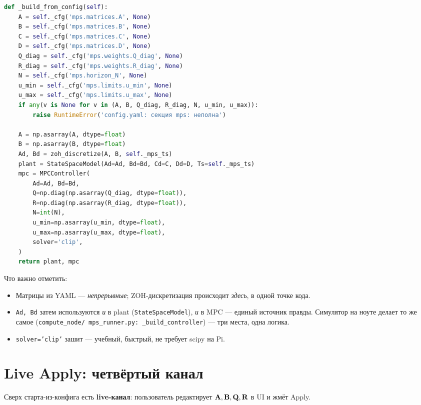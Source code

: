 \begin{codebox}[title={\filepath{pi\_nodes/nodes/mps\_node.py:180}, метод \texttt{\_build\_from\_config}}]
\begin{lstlisting}[language=Python]
def _build_from_config(self):
    A = self._cfg('mps.matrices.A', None)
    B = self._cfg('mps.matrices.B', None)
    C = self._cfg('mps.matrices.C', None)
    D = self._cfg('mps.matrices.D', None)
    Q_diag = self._cfg('mps.weights.Q_diag', None)
    R_diag = self._cfg('mps.weights.R_diag', None)
    N = self._cfg('mps.horizon_N', None)
    u_min = self._cfg('mps.limits.u_min', None)
    u_max = self._cfg('mps.limits.u_max', None)
    if any(v is None for v in (A, B, Q_diag, R_diag, N, u_min, u_max)):
        raise RuntimeError('config.yaml: секция mps: неполна')

    A = np.asarray(A, dtype=float)
    B = np.asarray(B, dtype=float)
    Ad, Bd = zoh_discretize(A, B, self._mps_ts)
    plant = StateSpaceModel(Ad=Ad, Bd=Bd, Cd=C, Dd=D, Ts=self._mps_ts)
    mpc = MPCController(
        Ad=Ad, Bd=Bd,
        Q=np.diag(np.asarray(Q_diag, dtype=float)),
        R=np.diag(np.asarray(R_diag, dtype=float)),
        N=int(N),
        u_min=np.asarray(u_min, dtype=float),
        u_max=np.asarray(u_max, dtype=float),
        solver='clip',
    )
    return plant, mpc
\end{lstlisting}
\end{codebox}

Что важно отметить:

\begin{itemize}
  \item Матрицы из YAML --- \emph{непрерывные}; ZOH-дискретизация
        происходит \emph{здесь}, в одной точке кода.
  \item \texttt{Ad, Bd} затем используются \emph{и} в plant
        (\texttt{StateSpaceModel}), \emph{и} в MPC --- единый источник
        правды. Симулятор на ноуте делает то же самое (\texttt{compute\_node/
        mps\_runner.py: \_build\_controller}) --- три места, одна логика.
  \item \texttt{solver='clip'} зашит --- учебный, быстрый, не требует
        scipy на Pi.
\end{itemize}

\section{Live Apply: четвёртый канал}

Сверх старта-из-конфига есть \textbf{live-канал}: пользователь
редактирует $\mathbf{A}, \mathbf{B}, \mathbf{Q}, \mathbf{R}$ в UI и жмёт Apply.

